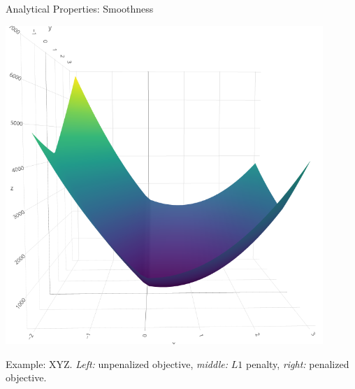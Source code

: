 \begin{vbframe}{Analytical Properties: Smoothness}
\begin{minipage}[c]{0.3\textwidth}
\end{minipage}%
\begin{minipage}[c]{0.05\textwidth}
  \phantom{foo}
\end{minipage}%
\begin{minipage}[c]{0.3\textwidth}
  \includegraphics[width=0.9\textwidth]{figure/lasso_penalized}
\end{minipage}%

\tiny Example: XYZ. \textit{Left:} unpenalized objective, \textit{middle:}
$L1$ penalty, \textit{right:} penalized objective.

\end{vbframe}


